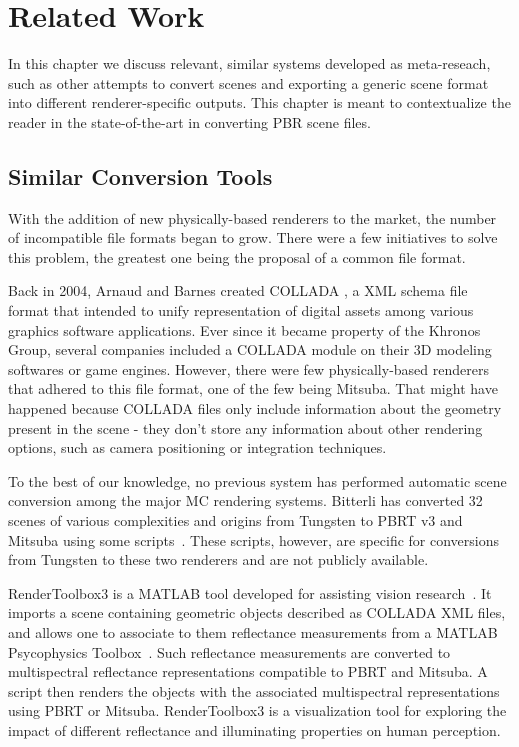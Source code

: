 \chapter{Related Work}
\label{sec:related_work}

In this chapter we discuss relevant, similar systems developed as meta-reseach, such as other attempts to convert scenes and exporting a generic 
scene format into different renderer-specific outputs. This chapter is meant to contextualize the reader in the state-of-the-art in converting PBR scene files.

\section{Similar Conversion Tools}

With the addition of new physically-based renderers to the market, the number of incompatible file formats began to grow. There were a few initiatives to solve this problem, the greatest one being the proposal of a common file format.

Back in 2004, Arnaud and Barnes created COLLADA \cite{collada}, a XML schema file format that intended to unify representation of digital assets among 
various graphics software applications. Ever since it became property of the Khronos Group, several companies included a COLLADA module on their 3D modeling 
softwares or game engines. However, there were few physically-based renderers that adhered to this file format, one of the few being Mitsuba. That might have 
happened because COLLADA files only include information about the geometry present in the scene - they don't store any information about other rendering 
options, such as camera positioning or integration techniques.

To the best of our knowledge, no previous system has performed automatic scene conversion among the major MC rendering systems. Bitterli has converted 32 scenes of various complexities and origins from Tungsten to PBRT v3 and Mitsuba using some scripts~\cite{tungsten}. These scripts, however, are specific for conversions from Tungsten to these two renderers and are not publicly available.

RenderToolbox3 is a MATLAB tool developed for assisting vision research~\cite{rendertoolbox}. It imports a scene containing geometric objects described as COLLADA XML files, and allows one to associate to them reflectance measurements from a MATLAB Psycophysics Toolbox~\cite{Brainard1997}. Such reflectance measurements are converted to multispectral reflectance representations compatible to PBRT and Mitsuba. A script then renders the objects with the associated multispectral representations using PBRT or Mitsuba. RenderToolbox3 is a visualization tool for exploring the impact of different reflectance and illuminating properties on human perception.

